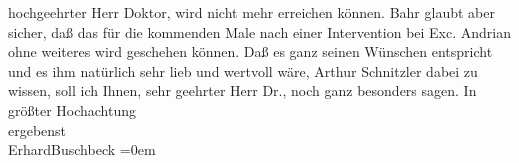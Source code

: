 \begin{ledgroupsized}[t]{13cm}
               hochgeehrter Herr Doktor, wird nicht mehr erreichen können. Bahr glaubt aber sicher, daß das für die kommenden Male nach
               einer Intervention bei Exc. Andrian ohne weiteres
               wird geschehen können. Daß es ganz seinen Wünschen entspricht und es ihm natürlich
               sehr lieb \introOben{}und wertvoll\introOben{} wäre, Arthur Schnitzler dabei zu
               wissen, soll ich Ihnen, sehr geehrter Herr Dr., noch ganz besonders sagen.\pend
           \pstart
           In größter Hochachtung{\\[\baselineskip]}ergebenst{\\[\baselineskip]}\spacefill\mbox{ErhardBuschbeck}\pend
           \leftskip=0em{}\endnumbering{}\end{ledgroupsized}  \newcommand{\dateiname}{L02305}\newcommand{\titel}{Erhard Buschbeck an Arthur Schnitzler, 24. 9. 1918}\newcommand{\editorInnen}{ Martin Anton Müller und Gerd-Hermann Susen}
      